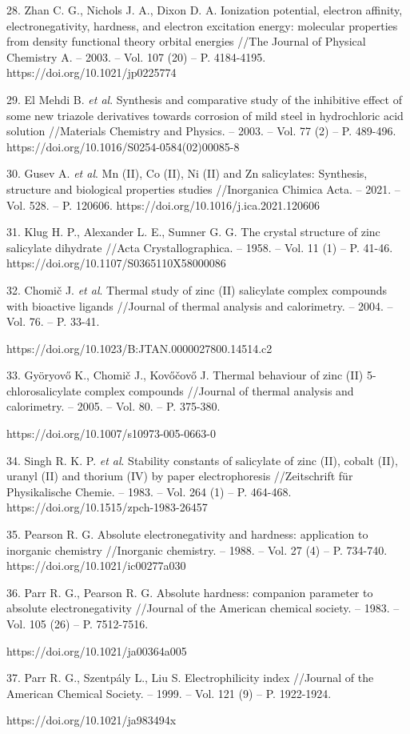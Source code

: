 \begin{noparindent}
28.
  Zhan C. G., Nichols J. A., Dixon D. A. Ionization potential, electron
  affinity, electronegativity, hardness, and electron excitation energy:
  molecular properties from density functional theory orbital energies
  //The Journal of Physical Chemistry A. -- 2003. -- Vol. 107 (20) -- P.
  4184-4195. https://doi.org/10.1021/jp0225774

29.
  El Mehdi B. \emph{et al}. Synthesis and comparative study of the
  inhibitive effect of some new triazole derivatives towards corrosion
  of mild steel in hydrochloric acid solution //Materials Chemistry and
  Physics. -- 2003. -- Vol. 77 (2) -- P. 489-496.
  https://doi.org/10.1016/S0254-0584(02)00085-8

30.
  Gusev A. \emph{et al}. Mn (II), Co (II), Ni (II) and Zn salicylates:
  Synthesis, structure and biological properties studies //Inorganica
  Chimica Acta. -- 2021. -- Vol. 528. -- P. 120606.
  https://doi.org/10.1016/j.ica.2021.120606

31.
  Klug H. P., Alexander L. E., Sumner G. G. The crystal structure of
  zinc salicylate dihydrate //Acta Crystallographica. -- 1958. -- Vol.
  11 (1) -- P. 41-46. https://doi.org/10.1107/S0365110X58000086

32.
  Chomič J. \emph{et al}. Thermal study of zinc (II) salicylate complex
  compounds with bioactive ligands //Journal of thermal analysis and
  calorimetry. -- 2004. -- Vol. 76. -- P. 33-41.

  https://doi.org/10.1023/B:JTAN.0000027800.14514.c2

33.
  Györyovő K., Chomič J., Kovőčovő J. Thermal behaviour of zinc (II)
  5-chlorosalicylate complex compounds //Journal of thermal analysis and
  calorimetry. -- 2005. -- Vol. 80. -- P. 375-380.

  https://doi.org/10.1007/s10973-005-0663-0

34.
  Singh R. K. P. \emph{et al}. Stability constants of salicylate of zinc
  (II), cobalt (II), uranyl (II) and thorium (IV) by paper
  electrophoresis //Zeitschrift für Physikalische Chemie. -- 1983. --
  Vol. 264 (1) -- P. 464-468. https://doi.org/10.1515/zpch-1983-26457

35.
  Pearson R. G. Absolute electronegativity and hardness: application to
  inorganic chemistry //Inorganic chemistry. -- 1988. -- Vol. 27 (4) --
  P. 734-740. https://doi.org/10.1021/ic00277a030

36.
  Parr R. G., Pearson R. G. Absolute hardness: companion parameter to
  absolute electronegativity //Journal of the American chemical society.
  -- 1983. -- Vol. 105 (26) -- P. 7512-7516.
  
  https://doi.org/10.1021/ja00364a005

37.
  Parr R. G., Szentpály L., Liu S. Electrophilicity index //Journal of
  the American Chemical Society. -- 1999. -- Vol. 121 (9) -- P.
  1922-1924.

  https://doi.org/10.1021/ja983494x
\end{noparindent}

